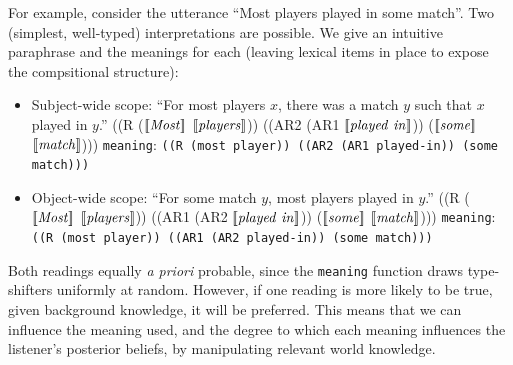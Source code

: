 \documentclass[pdfextras]{handbook}
\newcommand{\llbracket}{\ensuremath{\left [\!\left [}}%
\newcommand{\rrbracket}{\ensuremath{\right ]\!\right ]}}
\providecommand{\sv}[1]{\ensuremath{\llbracket \mathit{#1} \rrbracket}}
\begin{document}
For example, consider the utterance ``Most players played in some match''. 
Two (simplest, well-typed) interpretations are possible. We give an intuitive paraphrase and the meanings for each (leaving lexical items in place to expose the compsitional structure):
\begin{itemize}
\item Subject-wide scope:
\subitem ``For most players $x$, there was a match $y$ such that $x$ played in $y$.'' 
\subitem ((R (\sv{Most} \sv{players})) ((AR2 (AR1 \sv{played\ in})) (\sv{some} \sv{match})))
\subitem \lstinline{meaning}: \lstinline[mathescape]{((R (most player)) ((AR2 (AR1 played-in)) (some match)))}
\item Object-wide scope: 
\subitem ``For some match $y$, most players played in $y$.''
\subitem ((R (\sv{Most} \sv{players})) ((AR1 (AR2 \sv{played\ in})) (\sv{some} \sv{match})))
\subitem \lstinline{meaning}: \lstinline[mathescape]{((R (most player)) ((AR1 (AR2 played-in)) (some match)))}
\end{itemize}
Both readings equally \emph{a priori} probable, since the \lstinline{meaning} function draws type-shifters uniformly at random. 
However, if one reading is more likely to be true, given background knowledge, it will be preferred.
This means that we can influence the meaning used, and the degree to which each meaning influences the listener's posterior beliefs, by manipulating relevant world knowledge.
\end{document}
